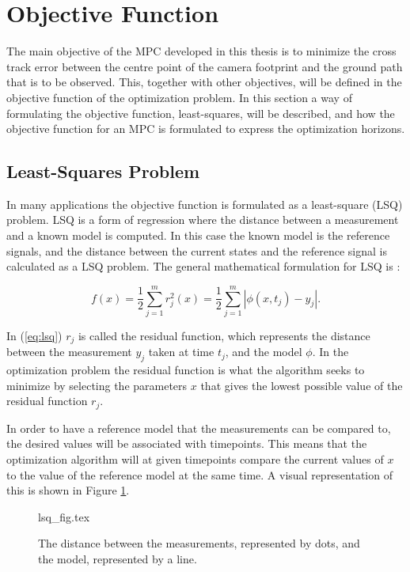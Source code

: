 \section{Objective Function}
\label{ch:objective_function}

The main objective of the MPC developed in this thesis is to minimize the cross track error between the centre point of the camera footprint and the ground path that is to be observed. This, together with other objectives, will be defined in the objective function of the optimization problem. In this section a way of formulating the objective function, least-squares, will be described, and how the objective function for an MPC is formulated to express the optimization horizons.


\subsection{Least-Squares Problem}

In many applications the objective function is formulated as a least-square (LSQ) problem. LSQ is a form of regression where the distance between a measurement and a known model is computed. In this case the known model is the reference signals, and the distance between the current states and the reference signal is calculated as a LSQ problem. The general mathematical formulation for LSQ is \cite{nocedalOPTIMIZATION}:

\begin{equation}
	\label{eq:lsq}
	f(x) = \frac{1}{2} \sum_{j=1}^m r_j^2(x) = \frac{1}{2} \sum_{j=1}^m |\phi(x, t_j) - y_j|.
\end{equation}

In (\ref{eq:lsq}) $r_j$ is called the residual function, which represents the distance between the measurement $y_j$ taken at time $t_j$, and the model $\phi$. In the optimization problem the residual function is what the algorithm seeks to minimize by selecting the parameters $x$ that gives the lowest possible value of the residual function $r_j$.

In order to have a reference model that the measurements can be compared to, the desired values will be associated with timepoints. This means that the optimization algorithm will at given timepoints compare the current values of $x$ to the value of the reference model at the same time. A visual representation of this is shown in Figure \ref{fig:lsq}.

\begin{figure}
	{lsq_fig.tex}
	\caption{The distance between the measurements, represented by dots, and the model, represented by a line.}
	\label{fig:lsq}
\end{figure}


